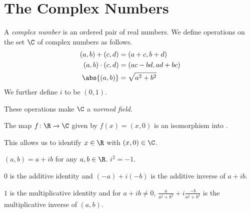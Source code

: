 \section{The Complex Numbers} \label{sec:C}
\begin{definition}
    A \emph{complex number} is an ordered pair of real numbers.
    We define operations on the set $\C$ of complex numbers as follows.
    \begin{align*}
        (a, b) + (c, d) &= (a + c, b + d) \\
        (a, b) \cdot (c, d) &= (ac - bd, ad + bc) \\
        \abs{(a, b)} &= \sqrt{a^2 + b^2}
    \end{align*}
    We further define $i$ to be $(0, 1)$.
\end{definition}
\begin{remark}
    These operations make $\C$ a \emph{normed field}.
\end{remark}

\begin{theorem}
    The map $f\colon \R \to \C$ given by $f(x) = (x, 0)$ is an isomorphism
    into \C.
\end{theorem}
This allows us to identify $x \in \R$ with $(x, 0) \in \C$.

\begin{remark}
    $(a, b) = a + ib$ for any $a, b \in \R$.
    $i^2 = -1$.

    $0$ is the additive identity and $(-a) + i(-b)$ is the additive inverse
    of $a + ib$.

    $1$ is the multiplicative identity and for $a + ib \ne 0$,
    $\frac{a}{a^2 + b^2} + i \frac{-b}{a^2 + b^2}$ is the multiplicative
    inverse of $(a, b)$.
\end{remark}

